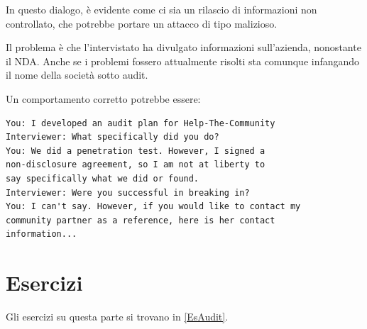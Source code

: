 In questo dialogo, è evidente come ci sia un rilascio di informazioni non
controllato, che potrebbe portare un attacco di tipo malizioso.

Il problema è che l'intervistato ha divulgato informazioni sull'azienda,
nonostante il NDA. Anche se i problemi fossero attualmente risolti sta comunque
infangando il nome della società sotto audit.


Un comportamento corretto potrebbe essere:
\begin{verbatim}
You: I developed an audit plan for Help-The-Community
Interviewer: What specifically did you do?
You: We did a penetration test. However, I signed a
non-disclosure agreement, so I am not at liberty to
say specifically what we did or found.
Interviewer: Were you successful in breaking in?
You: I can't say. However, if you would like to contact my
community partner as a reference, here is her contact
information...
\end{verbatim}

\section{Esercizi}
Gli esercizi su questa parte si trovano in \ref{EsAudit}.
















